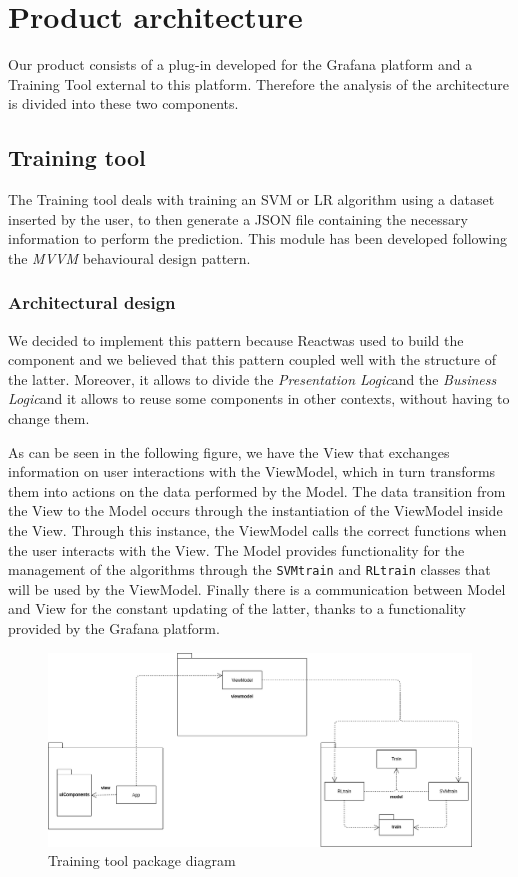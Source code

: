 \section{Product architecture}
Our product consists of a plug-in developed for the Grafana platform and a Training Tool external to this platform. Therefore the analysis of the architecture is divided into these two components.

\subsection{Training tool}
The Training tool deals with training an SVM or LR algorithm using a dataset inserted by the user, to then generate a JSON file containing the necessary information to perform the prediction. This module has been developed following the \textit{MVVM} behavioural design pattern.

\subsubsection{Architectural design}
We decided to implement this pattern because React\glo was used to build the component and we believed that this pattern coupled well with the structure of the latter. Moreover, it allows to divide the \textit{Presentation Logic}\glo and the \textit{Business Logic}\glo and it allows to reuse some components in other contexts, without having to change them.

As can be seen in the following figure, we have the View that exchanges information on user interactions with the ViewModel, which in turn transforms them into actions on the data performed by the Model.
The data transition from the View to the Model occurs through the instantiation of the ViewModel inside the View. Through this instance, the ViewModel calls the correct functions when the user interacts with the View. The Model provides functionality for the management of the algorithms through the \texttt{SVMtrain} and \texttt{RLtrain} classes that will be used by the ViewModel. 
Finally there is a communication between Model and View for the constant updating of the latter, thanks to a functionality provided by the Grafana platform.

\begin{figure}[H]
\centering
\includegraphics[scale=0.4]{../../../Diagrams/Package_diagrams/tool_design_patern.png}
\caption{Training tool package diagram}
\end{figure}


